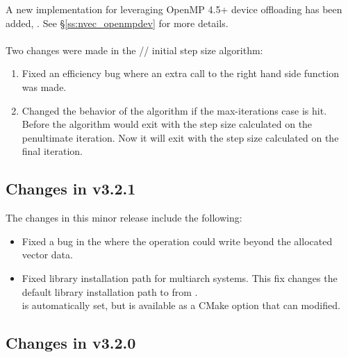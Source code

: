 A new {\nvector} implementation for leveraging OpenMP 4.5+ device offloading has
been added, {\nvecopenmpdev}. See \S\ref{ss:nvec_openmpdev} for more details.
\\
\\
\noindent Two changes were made in the {\cvode}/{\cvodes}/{\arkode} initial step
size algorithm:
\begin{enumerate}
  \item Fixed an efficiency bug where an extra call to the right hand side
        function was made.
  \item Changed the behavior of the algorithm if the max-iterations case is hit.
        Before the algorithm would exit with the step size calculated on the
        penultimate iteration. Now it will exit with the step size calculated
        on the final iteration.
\end{enumerate}


\subsection*{Changes in v3.2.1}

The changes in this minor release include the following:
\begin{itemize}
\item Fixed a bug in the {\cuda} {\nvector} where the  operation
  could write beyond the allocated vector data.
\item Fixed library installation path for multiarch systems. This fix changes the default
  library installation path to 
  from .\\
   is automatically
  set, but is available as a CMake option that can modified.
\end{itemize}

\subsection*{Changes in v3.2.0}

